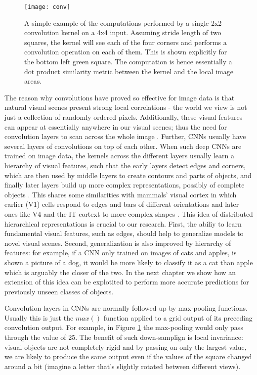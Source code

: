 \documentclass[12pt]{report}
\begin{document}
\begin{figure}
  \centering
	\texttt{[image: conv]}
	\caption{A simple example of the computations performed by a single 2x2 convolution kernel on a 4x4 input. Assuming stride length of two squares, the kernel will see each of the four corners and performs a convolution operation on each of them. This is shown explicitly for the bottom left green square. The computation is hence essentially a dot product similarity metric between the kernel and the local image areas.}
	\label{fig:conv}
\end{figure}

The reason why convolutions have proved so effective for image data is that natural visual scenes present strong local correlations - the world we view is not just a collection of randomly ordered pixels. Additionally, these visual features can appear at essentially anywhere in our visual scenes; thus the need for convolution layers to scan across the whole image \cite{Lecun2015}. Further, CNNs usually have several layers of convolutions on top of each other. When such deep CNNs are trained on image data, the kernels across the different layers usually learn a hierarchy of visual features, such that the early layers detect edges and corners, which are then used by middle layers to create contours and parts of objects, and finally later layers build up more complex representations, possibly of complete objects \cite{Zeiler2014}. This shares some similarities with mammals' visual cortex \cite{Cadieu2014} in which earlier (V1) cells respond to edges and bars of different orientations \cite{Hubeld1962} and later ones like V4 and the IT cortext to more complex shapes \cite{Kobatake1994}. This idea of distributed hierarchical representations is crucial to our research. First, the abiliy to learn fundamental visual features, such as edges, should help to generalize models to novel visual scenes. Second, generalization is also improved by hierarchy of features: for example, if a CNN only trained on images of cats and apples, is shown a picture of a dog, it would be more likely to classify it as a cat than apple which is arguably the closer of the two. In the next chapter we show how an extension of this idea can be explotited to perform more accurate predictions for previously unseen classes of objects.

Convolution layers in CNNs are normally followed up by max-pooling functions. Usually this is just the $max()$ function applied to a grid output of its preceding convolution output. For example, in Figure \ref{fig:conv} the max-pooling would only pass through the value of 25. The benefit of such down-samplign is local invariance: visual objects are not completely rigid and by passing on only the largest value, we are likely to produce the same output even if the values of the square changed around a bit \cite{Lecun2015} (imagine a letter that's slightly rotated between different views).
\end{document}
